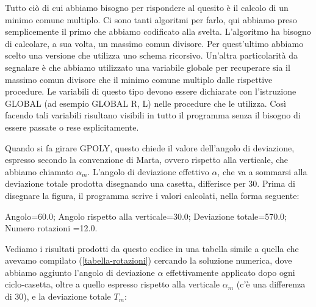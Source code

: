 \vskip 1cm

Tutto ciò di cui abbiamo bisogno per rispondere al quesito è il calcolo di un minimo comune multiplo. Ci sono tanti algoritmi per farlo, qui abbiamo preso semplicemente il primo che abbiamo codificato alla svelta. L'algoritmo ha bisogno di calcolare, a sua volta, un massimo comun divisore. Per quest'ultimo abbiamo scelto una versione che utilizza uno schema ricorsivo. Un'altra particolarità da segnalare è che abbiamo utilizzato una variabile globale per recuperare sia il massimo comun divisore che il minimo comune multiplo dalle rispettive procedure. Le variabili di questo tipo devono essere dichiarate con l'istruzione GLOBAL (ad esempio GLOBAL R, L) nelle procedure che le utilizza. Così facendo tali variabili risultano visibili in tutto il programma senza il bisogno di essere passate o rese esplicitamente.

Quando si fa girare GPOLY, questo chiede il valore dell'angolo di deviazione, espresso secondo la convenzione di Marta, ovvero rispetto alla verticale, che abbiamo chiamato $\alpha_m$. L'angolo di deviazione effettivo $\alpha$, che va a sommarsi alla deviazione totale prodotta disegnando una casetta, differisce per 30\degree. Prima di disegnare la figura, il programma scrive i valori calcolati, nella forma seguente: 

Angolo=60.0; Angolo rispetto alla verticale=30.0; Deviazione totale=570.0; Numero rotazioni =12.0.

Vediamo i risultati prodotti da questo codice in una tabella simile a quella che avevamo compilato (\ref{tabella-rotazioni}) cercando la soluzione numerica, dove abbiamo aggiunto l'angolo di deviazione $\alpha$ effettivamente applicato dopo ogni ciclo-casetta, oltre a quello espresso rispetto alla verticale $\alpha_m$ (c'è una differenza di 30\degree), e la deviazione totale $T_m$:

